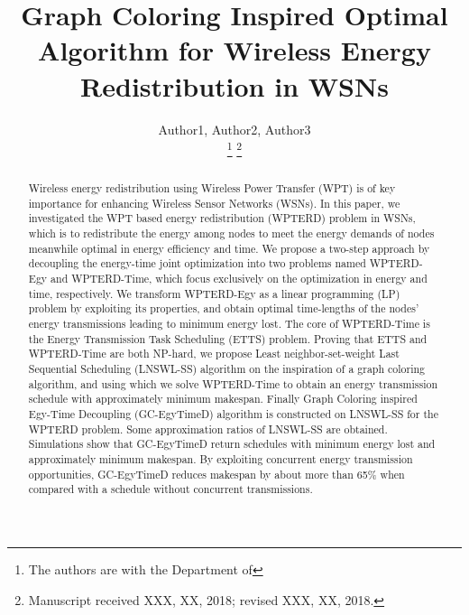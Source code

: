 \documentclass[12pt,journal,onecolumn,draftcls]{IEEEtran}
\begin{document}
\title{Graph Coloring Inspired Optimal Algorithm for Wireless Energy Redistribution in WSNs}


\author{Author1, Author2, Author3

\thanks{The authors are with the Department of }%
\thanks{Manuscript received XXX, XX, 2018; revised XXX, XX, 2018.}}

{}


\maketitle


\begin{abstract}
Wireless energy redistribution using Wireless Power Transfer (WPT) is of key importance for enhancing Wireless Sensor Networks (WSNs). In this paper, we investigated the WPT based energy redistribution (WPTERD) problem in WSNs, which is to redistribute the energy among nodes to meet the energy demands of nodes meanwhile optimal in energy efficiency and time. We propose a two-step approach by decoupling the energy-time joint optimization into two problems named WPTERD-Egy and WPTERD-Time, which focus exclusively on the optimization in energy and time, respectively. We transform WPTERD-Egy as a linear programming (LP) problem by exploiting its properties, and obtain optimal time-lengths of the nodes' energy transmissions leading to minimum energy lost. The core of WPTERD-Time is the Energy Transmission Task Scheduling (ETTS) problem. Proving that ETTS and WPTERD-Time are both NP-hard, we propose Least neighbor-set-weight Last Sequential Scheduling (LNSWL-SS) algorithm on the inspiration of a graph coloring algorithm, and using which we solve WPTERD-Time to obtain an energy transmission schedule with approximately minimum makespan. Finally Graph Coloring inspired Egy-Time Decoupling (GC-EgyTimeD) algorithm is constructed on LNSWL-SS for the WPTERD problem. Some approximation ratios of LNSWL-SS are obtained. Simulations show that GC-EgyTimeD return schedules with minimum energy lost and approximately minimum makespan. By exploiting concurrent energy transmission opportunities, GC-EgyTimeD reduces makespan by about more than 65\% when compared with a schedule without concurrent transmissions.

\end{abstract}
\end{document}
